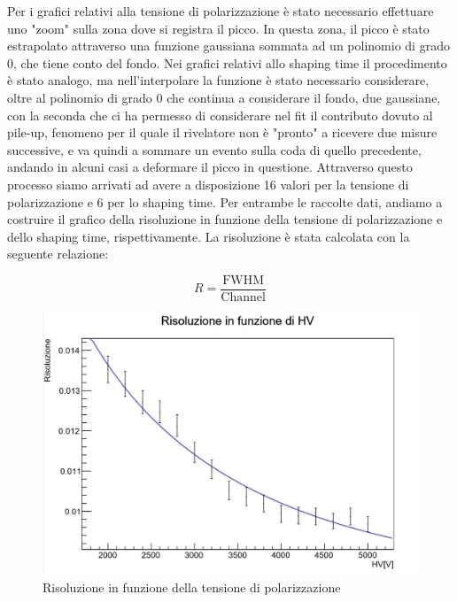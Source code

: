 \documentclass[a4paper,10pt]{article}
\begin{document}
Per i grafici relativi alla tensione di polarizzazione \`e stato necessario effettuare uno "zoom" sulla zona dove si registra il picco. In questa zona, il picco \`e stato estrapolato attraverso una funzione gaussiana sommata ad un polinomio di grado 0, che tiene conto del fondo. Nei grafici relativi allo shaping time il procedimento \`e stato analogo, ma nell'interpolare la funzione \`e stato necessario considerare, oltre al polinomio di grado 0 che continua a considerare il fondo, due gaussiane, con la seconda che ci ha permesso di considerare nel fit il contributo dovuto al pile-up, fenomeno per il quale il rivelatore non \`e "pronto" a ricevere due misure successive, e va quindi a sommare un evento sulla coda di quello precedente, andando in alcuni casi a deformare il picco in questione. Attraverso questo processo siamo arrivati ad avere a disposizione 16 valori per la tensione di polarizzazione e 6 per lo shaping time. Per entrambe le raccolte dati, andiamo a costruire il grafico della risoluzione in funzione della tensione di polarizzazione e dello shaping time, rispettivamente. La risoluzione \`e stata calcolata con la seguente relazione: 

\begin{equation}
	R=\frac{\textrm{FWHM}}{\textrm{Channel}}
\end{equation}

\begin{figure}[h!]
    \centering
    \includegraphics[scale=0.45]{grafici/risoluzionehv}
    \caption{Risoluzione in funzione della tensione di polarizzazione}
\end{figure}
\end{document}
